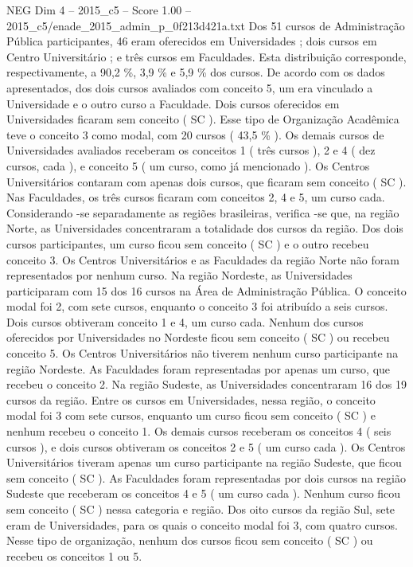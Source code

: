 \begin{textsample}{NEG Dim 4 – 2015\_c5 – Score 1.00 – 2015\_c5/enade\_2015\_admin\_p\_0f213d421a.txt}
Dos 51 cursos de Administração Pública participantes, 46 eram oferecidos em Universidades ; dois cursos em Centro Universitário ; e três cursos em Faculdades.
Esta distribuição corresponde, respectivamente, a 90,2 \%, 3,9 \% e 5,9 \% dos cursos.
De acordo com os dados apresentados, dos dois cursos avaliados com conceito 5, um era vinculado a Universidade e o outro curso a Faculdade.
Dois cursos oferecidos em Universidades ficaram sem conceito ( SC ).
Esse tipo de Organização Acadêmica teve o conceito 3 como modal, com 20 cursos ( 43,5 \% ).
Os demais cursos de Universidades avaliados receberam os conceitos 1 ( três cursos ), 2 e 4 ( dez cursos, cada ), e conceito 5 ( um curso, como já mencionado ).
Os Centros Universitários contaram com apenas dois cursos, que ficaram sem conceito ( SC ).
Nas Faculdades, os três cursos ficaram com conceitos 2, 4 e 5, um curso cada.
Considerando -se separadamente as regiões brasileiras, verifica -se que, na região Norte, as Universidades concentraram a totalidade dos cursos da região.
Dos dois cursos participantes, um curso ficou sem conceito ( SC ) e o outro recebeu conceito 3.
Os Centros Universitários e as Faculdades da região Norte não foram representados por nenhum curso.
Na região Nordeste, as Universidades participaram com 15 dos 16 cursos na Área de Administração Pública.
O conceito modal foi 2, com sete cursos, enquanto o conceito 3 foi atribuído a seis cursos.
Dois cursos obtiveram conceito 1 e 4, um curso cada.
Nenhum dos cursos oferecidos por Universidades no Nordeste ficou sem conceito ( SC ) ou recebeu conceito 5.
Os Centros Universitários não tiverem nenhum curso participante na região Nordeste.
As Faculdades foram representadas por apenas um curso, que recebeu o conceito 2.
Na região Sudeste, as Universidades concentraram 16 dos 19 cursos da região.
Entre os cursos em Universidades, nessa região, o conceito modal foi 3 com sete cursos, enquanto um curso ficou sem conceito ( SC ) e nenhum recebeu o conceito 1.
Os demais cursos receberam os conceitos 4 ( seis cursos ), e dois cursos obtiveram os conceitos 2 e 5 ( um curso cada ).
Os Centros Universitários tiveram apenas um curso participante na região Sudeste, que ficou sem conceito ( SC ).
As Faculdades foram representadas por dois cursos na região Sudeste que receberam os conceitos 4 e 5 ( um curso cada ).
Nenhum curso ficou sem conceito ( SC ) nessa categoria e região.
Dos oito cursos da região Sul, sete eram de Universidades, para os quais o conceito modal foi 3, com quatro cursos.
Nesse tipo de organização, nenhum dos cursos ficou sem conceito ( SC ) ou recebeu os conceitos 1 ou 5.

\end{textsample}
